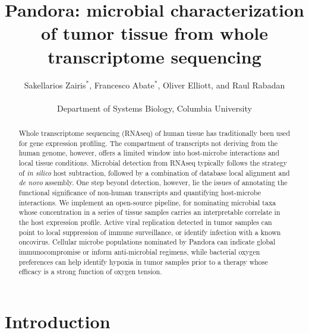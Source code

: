 \documentclass[twocolumn,11pt]{article}
\begin{document}
\title{Pandora: microbial characterization of tumor tissue from whole transcriptome sequencing}

\author{Sakellarios Zairis$^*$, Francesco Abate$^*$, Oliver Elliott, and Raul Rabadan\\
\\
Department of Systems Biology, Columbia University}
\maketitle



\begin{abstract}

Whole transcriptome sequencing (RNAseq) of human tissue has traditionally been used for gene expression profiling.
The compartment of transcripts not deriving from the human genome, however, offers a limited window into host-microbe interactions and local tissue conditions.
Microbial detection from RNAseq typically follows the strategy of \textit{in silico} host subtraction, followed by a combination of database local alignment and \textit{de novo} assembly.
One step beyond detection, however, lie the issues of annotating the functional significance of non-human transcripts and quantifying host-microbe interactions.
We implement an open-source pipeline, for nominating microbial taxa whose concentration in a series of tissue samples carries an interpretable correlate in the host expression profile.
Active viral replication detected in tumor samples can point to local suppression of immune surveillance, or identify infection with a known oncovirus.
Cellular microbe populations nominated by Pandora can indicate global immunocompromise or inform anti-microbial regimens, while bacterial oxygen preferences can help identify hypoxia in tumor samples prior to a therapy whose efficacy is a strong function of oxygen tension. 

\end{abstract}


\section*{Introduction}
\end{document}
